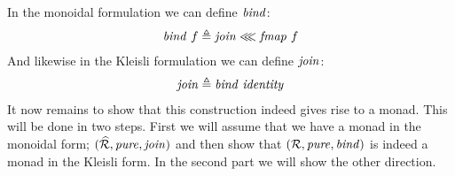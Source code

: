 In the monoidal formulation we can define $\bind$:
%
\newcommand\joinX{\wideoverbar{\join}}%
\newcommand\bindX{\wideoverbar{\bind}}%
\newcommand\EndoRX{\wideoverbar{\EndoR}}%
\newcommand\pureX{\wideoverbar{\pure}}%
\newcommand\fmapX{\wideoverbar{\fmap}}%
\begin{align}
\bind\ f \defeq \join \lll \fmap\ f
\end{align}
%
And likewise in the Kleisli formulation we can define $\join$:
%
\begin{align}
\join \defeq \bind\ \identity
\end{align}
%
It now remains to show that this construction indeed gives rise to a
monad. This will be done in two steps. First we will assume that we
have a monad in the monoidal form; $(\EndoR, \pure, \join)$ and then
show that $(\omapR, \pure, \bind)$ is indeed a monad in the Kleisli
form. In the second part we will show the other direction.


